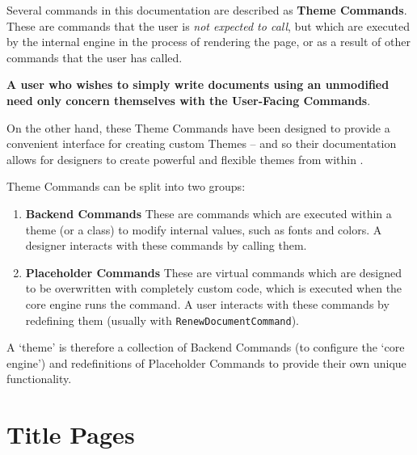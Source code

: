 		Several commands in this documentation are described as \textbf{Theme Commands}. These are commands that the user is \textit{not expected to call}, but which are executed by the internal engine in the process of rendering the page, or as a result of other commands that the user has called. 

		\begin{center}
		\large \textbf{A user who wishes to simply write documents using an unmodified \rpgtex{} need only concern themselves with the User-Facing Commands}. 
		\end{center}
		On the other hand, these Theme Commands have been designed to provide a convenient interface for creating custom Themes -- and so their documentation allows for designers to create powerful and flexible themes from within \rpgtex{}. 
		
		Theme Commands can be split into two groups:
		
		\begin{enumerate}
			\item \textbf{Backend Commands} These are commands which are executed within a theme (or a class) to modify internal values, such as fonts and colors. A designer interacts with these commands by calling them.
			\item \textbf{Placeholder Commands} These are virtual commands which are designed to be overwritten with completely custom code, which is executed when the core engine runs the command. A user interacts with these commands by redefining them  (usually with \verb|RenewDocumentCommand|).
		\end{enumerate}

		A `theme' is therefore a collection of Backend Commands (to configure the `core engine') and redefinitions of Placeholder Commands to provide their own unique functionality.
		\def\backendCommand{\hyperref[S:ThemeCommands]{\textcolor{blue!40!black}{{Backend Command}}}}
		\def\placeholderCommand{\hyperref[S:ThemeCommands]{\textcolor{blue!40!black}{{Placeholder Command}}}}
		
	\section{Title Pages}
